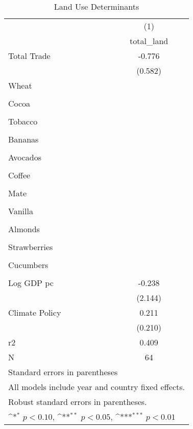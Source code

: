 \begin{table}[htbp]\centering
\def\sym#1{\ifmmode^{#1}\else\(^{#1}\)\fi}
\caption{Land Use Determinants\label{tab:landuse}}
\begin{tabular}{l*{1}{c}}
\toprule
          &\multicolumn{1}{c}{(1)}\\
          &\multicolumn{1}{c}{total\_land}\\
\midrule
Total Trade&   -0.776         \\
          &  (0.582)         \\
Wheat     &                  \\
          &                  \\
Cocoa     &                  \\
          &                  \\
Tobacco   &                  \\
          &                  \\
Bananas   &                  \\
          &                  \\
Avocados  &                  \\
          &                  \\
Coffee    &                  \\
          &                  \\
Mate      &                  \\
          &                  \\
Vanilla   &                  \\
          &                  \\
Almonds   &                  \\
          &                  \\
Strawberries&                  \\
          &                  \\
Cucumbers &                  \\
          &                  \\
Log GDP pc&   -0.238         \\
          &  (2.144)         \\
Climate Policy&    0.211         \\
          &  (0.210)         \\
\midrule
r2        &    0.409         \\
N         &       64         \\
\bottomrule
\multicolumn{2}{l}{\footnotesize Standard errors in parentheses}\\
\multicolumn{2}{l}{\footnotesize All models include year and country fixed effects.}\\
\multicolumn{2}{l}{\footnotesize Robust standard errors in parentheses.}\\
\multicolumn{2}{l}{\footnotesize \sym{*} \(p<0.10\), \sym{**} \(p<0.05\), \sym{***} \(p<0.01\)}\\
\end{tabular}
\end{table}
